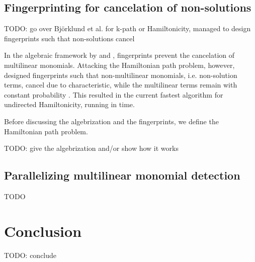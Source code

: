 \subsection{Fingerprinting for cancelation of non-solutions}
\label{sect:cancel_nonsolutions}

TODO: go over Björklund et al. for k-path or Hamiltonicity, managed to design fingerprints such that non-solutions cancel

In the algebraic framework by \citeauthor{Koutis08} and \citeauthor{Williams09}, 
fingerprints prevent the cancelation of multilinear monomials. 
Attacking the Hamiltonian path problem, however, \citeauthor{Björklund14} 
designed fingerprints such that non-multilinear monomials, i.e. non-solution terms, 
cancel due to characteristic, while the multilinear terms 
remain with constant probability \cite{Björklund14}. This resulted in the current 
fastest algorithm for undirected Hamiltonicity, running in  time.

Before discussing the algebrization and the fingerprints, 
we define the Hamiltonian path problem.

\begin{problem}
\end{problem}

TODO: give the algebrization and/or show how it works

\subsection{Parallelizing multilinear monomial detection}
\label{sect:parallelization}


TODO
\clearpage
\section{Conclusion}

TODO: conclude
